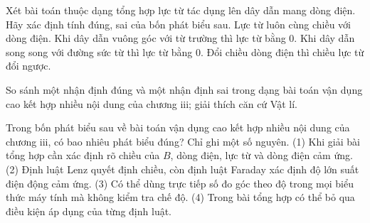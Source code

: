 \begin{ex}
Xét bài toán thuộc dạng tổng hợp lực từ tác dụng lên dây dẫn mang dòng điện. Hãy xác định tính đúng, sai của bốn phát biểu sau.
\choiceTF
{Lực từ luôn cùng chiều với dòng điện.}
{Khi dây dẫn vuông góc với từ trường thì lực từ bằng 0.}
{\True Khi dây dẫn song song với đường sức từ thì lực từ bằng 0.}
{\True Đổi chiều dòng điện thì chiều lực từ đổi ngược.}
\end{ex}

\begin{bt}
So sánh một nhận định đúng và một nhận định sai trong dạng bài toán vận dụng cao kết hợp nhiều nội dung của chương iii; giải thích căn cứ Vật lí.
\end{bt}

\begin{ex}
Trong bốn phát biểu sau về bài toán vận dụng cao kết hợp nhiều nội dung của chương iii, có bao nhiêu phát biểu đúng? Chỉ ghi một số nguyên. (1) Khi giải bài tổng hợp cần xác định rõ chiều của $B$, dòng điện, lực từ và dòng điện cảm ứng. (2) Định luật Lenz quyết định chiều, còn định luật Faraday xác định độ lớn suất điện động cảm ứng. (3) Có thể dùng trực tiếp số đo góc theo độ trong mọi biểu thức máy tính mà không kiểm tra chế độ. (4) Trong bài tổng hợp có thể bỏ qua điều kiện áp dụng của từng định luật.
\end{ex}


